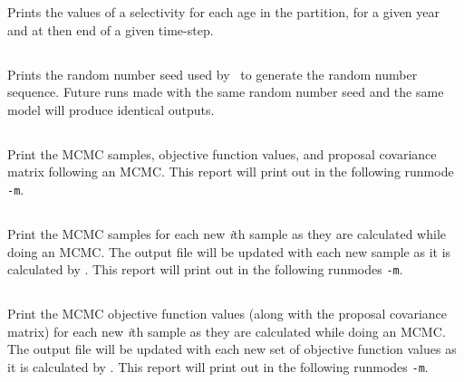 Prints the values of a selectivity for each age in the partition, for a given year and at then end of a given time-step.

\subsection{}

Prints the random number seed used by \CNAME\ to generate the random number sequence. Future runs made with the same random number seed and the same model will produce identical outputs.

\subsection{}

Print the MCMC samples, objective function values, and proposal covariance matrix following an MCMC. This report will print out in the following runmode \texttt{-m}.

\subsection{}

Print the MCMC samples for each new \textit{i}th sample as they are calculated while doing an MCMC. The output file will be updated with each new sample as it is calculated by \CNAME. This report will print out in the following runmodes \texttt{-m}.

\subsection{}

Print the MCMC objective function values (along with the proposal covariance matrix) for each new \textit{i}th sample as they are calculated while doing an MCMC. The output file will be updated with each new set of objective function values as it is calculated by \CNAME. This report will print out in the following runmodes \texttt{-m}.

\subsection{}

